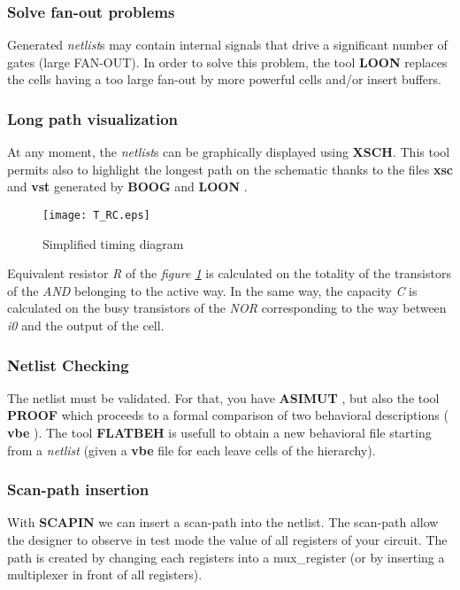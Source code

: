 \documentclass[12pt]{article}
\begin{document}
{\subsubsection{Solve fan-out problems }
    Generated { \it netlist}\/s may contain internal signals that drive a
    significant number of gates (large FAN-OUT).
    In order to solve this problem, the tool
    { \bf LOON } replaces the cells having a too large fan-out by more powerful
    cells and/or insert buffers.

\subsubsection{Long path visualization }
    At any moment, the { \it netlist}\/s can be graphically displayed using {\bf XSCH}.
This tool permits also to highlight the longest path on the schematic thanks to the files { \bf
xsc } and { \bf vst } generated by { \bf BOOG } and { \bf LOON }.

\begin{figure}[H]\centering
  \texttt{[image: T\_RC.eps]}
 \caption{Simplified timing diagram }
  \label{Fig:T_RC}
\end{figure}

Equivalent resistor { \it R } of the { \it figure \ref{Fig:T_RC} }
is calculated on the totality of the transistors of the { \it AND
} belonging to the active way. In the same way, the capacity { \it
C } is calculated on the busy transistors of the { \it NOR }
corresponding to the way between { \it i0 } and the output of the
cell.

\subsubsection{Netlist Checking}
    The netlist must be validated. For that, you have { \bf ASIMUT },
    but also the tool { \bf PROOF } which proceeds to a formal comparison of two behavioral
    descriptions ({ \bf vbe }). The tool { \bf FLATBEH } is usefull to obtain a
    new behavioral file starting from a { \it netlist } 
   (given a {\bf vbe} file for each leave cells of the hierarchy).

\subsubsection{Scan-path insertion}
    With { \bf SCAPIN } we can insert a scan-path into the netlist.
    The scan-path allow the designer to observe in test mode the value of all registers of your circuit. 
    The path is created by changing each registers into a mux\_register (or by inserting a multiplexer
    in front of all registers).

}
\end{document}
